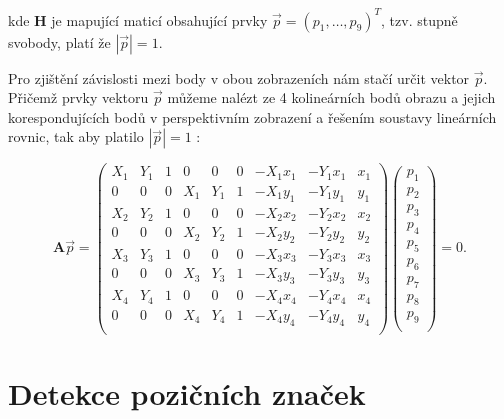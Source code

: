 \bigskip \noindent kde $\mathbf{H}$ je mapující maticí obsahující prvky $\vec{p}
= (p_1, \ldots, p_9)^T$, tzv. stupně svobody, platí že $|\vec{p}|=1$. 

Pro zjištění závislosti mezi body v obou zobrazeních nám stačí určit vektor
$\vec{p}$. Přičemž prvky vektoru $\vec{p}$ můžeme nalézt ze 4 kolineárních bodů
obrazu a jejich korespondujících bodů v perspektivním zobrazení a řešením 
soustavy lineárních rovnic, tak aby 
platilo $|\vec{p}|=1$ \cite{homografieCite,homografieComputerVision}: 

\begin{equation}
  \mathbf{A} \vec{p} =
  \left(
    \begin{array}{ccccccccc}
      X_{1} & Y_{1} & 1 & 0 & 0 & 0 & -X_{1} x_{1} & -Y_{1} x_{1} & x_{1} \\
      0 & 0 & 0 & X_{1} & Y_{1} & 1 & -X_{1} y_{1} & -Y_{1} y_{1} & y_{1} \\
      X_{2} & Y_{2} & 1 & 0 & 0 & 0 & -X_{2} x_{2} & -Y_{2} x_{2} & x_{2} \\
      0 & 0 & 0 & X_{2} & Y_{2} & 1 & -X_{2} y_{2} & -Y_{2} y_{2} & y_{2} \\
      X_{3} & Y_{3} & 1 & 0 & 0 & 0 & -X_{3} x_{3} & -Y_{3} x_{3} & x_{3} \\
      0 & 0 & 0 & X_{3} & Y_{3} & 1 & -X_{3} y_{3} & -Y_{3} y_{3} & y_{3} \\
      X_{4} & Y_{4} & 1 & 0 & 0 & 0 & -X_{4} x_{4} & -Y_{4} x_{4} & x_{4} \\
      0 & 0 & 0 & X_{4} & Y_{4} & 1 & -X_{4} y_{4} & -Y_{4} y_{4} & y_{4} \\
    \end{array}
  \right)
  \left(
    \begin{array}{c}
      p_{1} \\
      p_{2} \\
      p_{3} \\
      p_{4} \\
      p_{5} \\
      p_{6} \\
      p_{7} \\
      p_{8} \\
      p_{9} \\
    \end{array}
  \right)
  = 0\mbox{.}
\end{equation}

\section{Detekce pozičních značek}
\label{detekcePozicnichZnacek}

